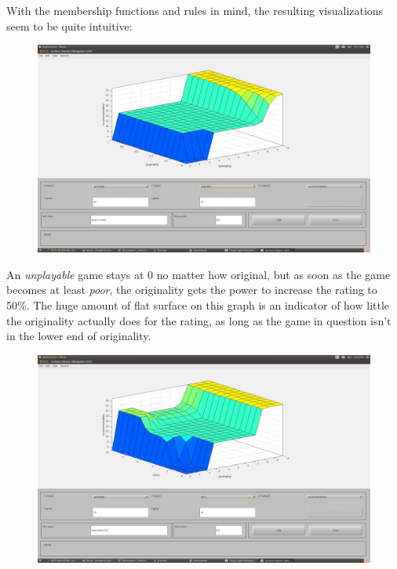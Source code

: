 \documentclass[a4paper, 11pt]{article}
\begin{document}
\newpage

With the membership functions and rules in mind, the resulting visualizations seem to be quite intuitive:

\begin{figure}[ht]
\includegraphics[scale=0.12]{vg-surface-g-o.jpg}
\end{figure}

An \textit{unplayable} game stays at 0 no matter how original, but as soon as the game becomes at least \textit{poor}, the originality gets the power to increase the rating to 50\%. The huge amount of flat surface on this graph is an indicator of how little the originality actually does for the rating, as long as the game in question isn't in the lower end of originality.

\begin{figure}[ht]
\includegraphics[scale=0.12]{vg-surface-g-s.jpg}
\end{figure}
\end{document}
